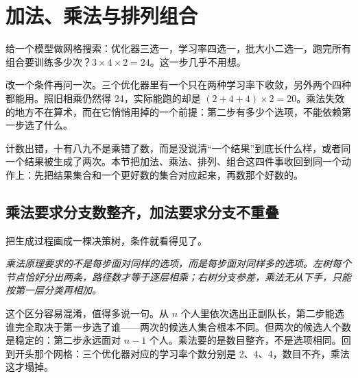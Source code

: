 \section{加法、乘法与排列组合}
\label{sec:04-Discrete-Mathematics/01-Combinatorics/01}

给一个模型做网格搜索：优化器三选一，学习率四选一，批大小二选一，跑完所有组合要训练多少次？\(3\times4\times2=24\)。这一步几乎不用想。

改一个条件再问一次。三个优化器里有一个只在两种学习率下收敛，另外两个四种都能用。照旧相乘仍然得 24，实际能跑的却是 \((2+4+4)\times2=20\)。乘法失效的地方不在算术，而在它悄悄用掉的一个前提：第二步有多少个选项，不能依赖第一步选了什么。

计数出错，十有八九不是乘错了数，而是没说清``一个结果''到底长什么样，或者同一个结果被生成了两次。本节把加法、乘法、排列、组合这四件事收回到同一个动作上：先把结果集合和一个更好数的集合对应起来，再数那个好数的。

\subsection{乘法要求分支数整齐，加法要求分支不重叠}

把生成过程画成一棵决策树，条件就看得见了。

\begin{center}

\emph{乘法原理要求的不是每步面对同样的选项，而是每步面对同样多的选项。左树每个节点恰好分出两条，路径数才等于逐层相乘；右树分支参差，乘法无从下手，只能按第一层分类再相加。}
\end{center}

这个区分容易混淆，值得多说一句。从 \(n\) 个人里依次选出正副队长，第二步能选谁完全取决于第一步选了谁——两次的候选人集合根本不同。但两次的候选人个数是稳定的：第二步永远面对 \(n-1\) 个人。乘法要的是数目整齐，不是选项相同。回到开头那个网格：三个优化器对应的学习率个数分别是 2、4、4，数目不齐，乘法这才塌掉。

